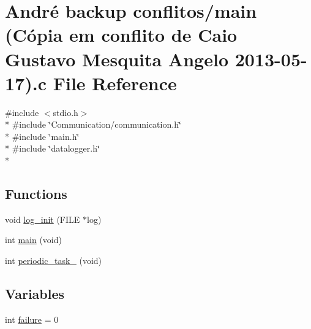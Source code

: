 \hypertarget{main_01_07C_xC3_xB3pia_01em_01conflito_01de_01Caio_01Gustavo_01Mesquita_01Angelo_012013-05-17_08_8c}{\section{André backup conflitos/main (Cópia em conflito de Caio Gustavo Mesquita Angelo 2013-\/05-\/17).c File Reference}
\label{main_01_07C_xC3_xB3pia_01em_01conflito_01de_01Caio_01Gustavo_01Mesquita_01Angelo_012013-05-17_08_8c}
}
{\ttfamily \#include $<$stdio.\-h$>$}\\*
{\ttfamily \#include \char`\"{}Communication/communication.\-h\char`\"{}}\\*
{\ttfamily \#include \char`\"{}main.\-h\char`\"{}}\\*
{\ttfamily \#include \char`\"{}datalogger.\-h\char`\"{}}\\*
\subsection*{Functions}
\begin{DoxyCompactItemize}
\item 
void \hyperlink{main_01_07C_xC3_xB3pia_01em_01conflito_01de_01Caio_01Gustavo_01Mesquita_01Angelo_012013-05-17_08_8c_aa570d24f638774bf52f70f1d9d9d45f8}{log\-\_\-init} (F\-I\-L\-E $\ast$log)
\item 
int \hyperlink{main_01_07C_xC3_xB3pia_01em_01conflito_01de_01Caio_01Gustavo_01Mesquita_01Angelo_012013-05-17_08_8c_a840291bc02cba5474a4cb46a9b9566fe}{main} (void)
\item 
int \hyperlink{main_01_07C_xC3_xB3pia_01em_01conflito_01de_01Caio_01Gustavo_01Mesquita_01Angelo_012013-05-17_08_8c_a26855b7739897854265d51aa61329390}{periodic\-\_\-task\-\_} (void)
\end{DoxyCompactItemize}
\subsection*{Variables}
\begin{DoxyCompactItemize}
\item 
int \hyperlink{main_01_07C_xC3_xB3pia_01em_01conflito_01de_01Caio_01Gustavo_01Mesquita_01Angelo_012013-05-17_08_8c_a4f35e5ea2395561d0bd3b2f45612dc2c}{failure} = 0
\end{DoxyCompactItemize}


